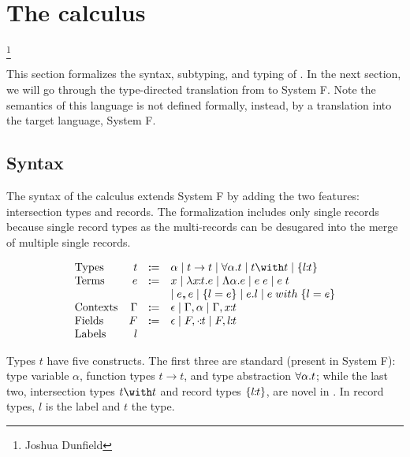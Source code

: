 \section{The \name calculus}

\footnote{Joshua Dunfield}

This section formalizes the syntax, subtyping, and typing of \name. In the next
section, we will go through the type-directed translation from \name to System
F. Note the semantics of this language is not defined formally, instead, by a
translation into the target language, System F.

\subsection{Syntax}

The syntax of the \name calculus extends System F by adding the two features:
intersection types and records. The formalization includes only single records
because single record types as the multi-records can be desugared into the merge
of multiple single records.

\[ \begin{array}{lrrl}
  \text{Types} & t & \dcoloneq &
    \alpha
    \mid t \to t
    \mid \univquant{\alpha}{t}
    \mid t \with t
    \mid \recordtype{l}{t} \\

  \text{Terms} & e & \dcoloneq &
    x
    \mid \abs{\rel{x}{t}}{e}
    \mid \Abs{\alpha}{e}
    \mid \app{e}{e}
    \mid \app{e}{t} \\ & & &
    \mid e \dcomma e
    \mid \recordintro{l}{e}
    \mid e.l
    \mid \recordupdate{e}{l}{e} \\

  \text{Contexts} & \Gamma & \dcoloneq &
    \epsilon
    \mid \Gamma, \alpha
    \mid \Gamma, \rel{x}{t} \\

  \text{Fields} & F & \dcoloneq &
    \epsilon
    \mid F, \rel{\cdot}{t}
    \mid F, \rel{l}{t} \\

  \text{Labels} & l &
\end{array} \]

Types $ t $ have five constructs. The first three are standard (present in
System F): type variable $ \alpha $, function types $ t \to t $, and type
abstraction $ \forall \alpha. t $; while the last two, intersection types
$ t \with t $ and record types $ \{ l \!\!:\!\! t \} $, are novel in \Name. In
record types, $ l $ is the label and $ t $ the type.

